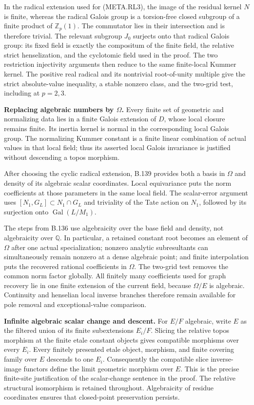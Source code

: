 In the radical extension used for (META.RL3), the
image of the residual kernel $N$ is finite, whereas
the radical Galois group is a torsion-free closed
subgroup of a finite product of $\mathbb Z_p(1)$.
The commutator lies in their intersection and is
therefore trivial.  The relevant subgroup $J_0$
surjects onto that radical Galois group: its fixed
field is exactly the compositum of the finite field,
the relative strict henselization, and the cyclotomic
field used in the proof.  The two restriction
injectivity arguments then reduce to the same
finite-local Kummer kernel.  The positive real
radical and its nontrivial root-of-unity multiple
give the strict absolute-value inequality, a stable
nonzero class, and the two-grid test, including at
$p=2,3$.

\medskip\noindent\textbf{Replacing algebraic numbers by $\Omega$.}
Every finite set of geometric and normalizing data
lies in a finite Galois extension of $D$, whose local
closure remains finite.  Its inertia kernel is
normal in the corresponding local Galois group.
The normalizing Kummer constant is a finite linear
combination of actual values in that local field;
thus its asserted local Galois invariance is justified
without descending a topos morphism.

After choosing the cyclic radical extension, B.139
provides both a basis in $\Omega$ and density of its
algebraic scalar coordinates.  Local equivariance
puts the norm coefficients at those parameters in
the same local field.  The scalar-error argument
uses $[N_1,G_L]\subset N_1\cap G_L$ and triviality of
the Tate action on $N_1$, followed by its surjection
onto $\operatorname{Gal}(L/M_1)$.

The steps from B.136 use algebraicity over the base
field and density, not algebraicity over $\mathbb Q$.
In particular, a retained constant root becomes an
element of $\Omega$ after one actual specialization;
nonzero analytic subresultants can simultaneously
remain nonzero at a dense algebraic point; and
finite interpolation puts the recovered rational
coefficients in $\Omega$.  The two-grid test removes
the common norm factor globally.  All finitely many
coefficients used for graph recovery lie in one
finite extension of the current field, because
$\Omega/E$ is algebraic.  Continuity and henselian
local inverse branches therefore remain available
for pole removal and exceptional-value comparison.

\medskip\noindent\textbf{Infinite algebraic scalar change and descent.}
For $E/F$ algebraic, write $E$ as the filtered union
of its finite subextensions $E_i/F$.  Slicing the
relative topos morphism at the finite etale constant
objects gives compatible morphisms over every $E_i$.
Every finitely presented etale object, morphism,
and finite covering family over $E$ descends to one
$E_i$.  Consequently the compatible slice
inverse-image functors define the limit geometric
morphism over $E$.  This is the precise finite-site
justification of the scalar-change sentence in the
proof.  The relative structural isomorphism is
retained throughout.  Algebraicity of residue
coordinates ensures that closed-point preservation
persists.

